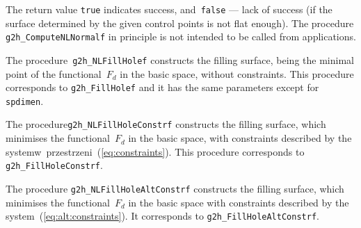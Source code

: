 The return value \texttt{true} indicates success, and~\texttt{false} ---
lack of success (if the surface determined by the given control points is
not flat enough). The procedure \texttt{g2h\_ComputeNLNormalf} in principle is
not intended to be called from applications.

\vspace{\bigskipamount}
The procedure~\texttt{g2h\_NLFillHolef} constructs the filling surface,
being the minimal point of the functional~$F_d$ in the basic space, without
constraints. This procedure corresponds to \texttt{g2h\_FillHolef}
and it has the same parameters except for \texttt{spdimen}.

\vspace{\bigskipamount}
\begin{sloppypar}
The procedure\texttt{g2h\_NLFillHoleConstrf} constructs the filling surface,
which minimises the functional~$F_d$ in the basic space, with constraints
described by the systemw~przestrzeni~(\ref{eq:constraints}). This procedure
corresponds to \texttt{g2h\_FillHoleConstrf}.%
\end{sloppypar}

\vspace{\bigskipamount}
The procedure \texttt{g2h\_NLFillHoleAltConstrf} constructs the filling surface,
which minimises the functional~$F_d$ in the basic space with constraints
described by the system~(\ref{eq:alt:constraints}). It corresponds to
\texttt{g2h\_FillHoleAltConstrf}.

